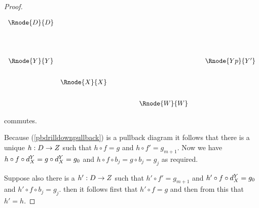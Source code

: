 \documentclass[10pt,a4paper]{scrartcl}
\begin{document}
\begin{proof}
\begin{center}
\begin{displaymath}
\begin{array}{c c p{1.0cm} c p{0.2cm}c}
  \Rnode{D}{D} & &                       & &  &                  \\ [1.6cm]
  \Rnode{Y}{Y} & &                       & &  & \Rnode{Yp}{Y'}   \\ [0.7cm]
	             &  \Rnode{X}{X} & &  &                  \\ [0.7cm]
	             & &                       & \Rnode{W}{W} & & 
\end{array} 
\end{displaymath}
\end{center}

commutes.

Because (\ref{pbdrilldownpullback}) is a pullback diagram  it follows that there is a unique $h:D \rightarrow Z$
such that $h \circ f=g$ and $h \circ f'=g_{m+1}$.
\noindent
Now we have $h \circ f \circ d^{Y}_{X}= g \circ d^{Y}_{X}=g_0$
and $h \circ f \circ b_j = g \circ b_j = g_j$ as required.

\noindent
Suppose also there is a $h' :D \rightarrow Z$ such that
$h' \circ f' =g_{m+1}$
and
$h' \circ f\circ d^{Y}_{X}=g_0$
and 
$h' \circ f \circ b_j=g_j$.
then it follows first that $h' \circ f=g$ and then from this that $h'=h$. 
\end{proof}
\end{document}
